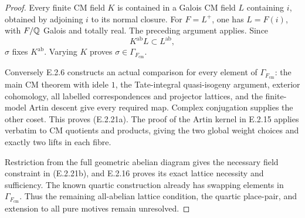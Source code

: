 \begin{proof}
Every finite CM field \(K\) is contained in
a Galois CM field \(L\) containing \(i\), obtained
by adjoining \(i\) to its normal closure.
For \(F=L^+\), one has \(L=F(i)\), with \(F/\mathbb Q\)
Galois and totally real. The preceding argument
applies. Since
\[
 K^{\mathrm{ab}}L\subset L^{\mathrm{ab}},
\]
\(\sigma\) fixes \(K^{\mathrm{ab}}\).
Varying \(K\) proves
\(\sigma\in\Gamma_{F_{\mathrm{cm}}}\).

Conversely E.2.6 constructs an actual comparison
for every element of \(\Gamma_{F_{\mathrm{cm}}}\):
the main CM theorem with idele \(1\), the
Tate-integral quasi-isogeny argument, exterior
cohomology, all labelled correspondences and
projector lattices, and the finite-model
Artin descent give every required map.
Complex conjugation supplies the other coset.
This proves (E.2.21a).
The proof of the Artin kernel in E.2.15 applies
verbatim to CM quotients and products, giving
the two global weight choices and exactly
two lifts in each fibre.

Restriction from the full geometric abelian
diagram gives the necessary field constraint
in (E.2.21b), and E.2.16 proves its exact
lattice necessity and sufficiency.
The known quartic construction already has
swapping elements in \(\Gamma_{F_{\mathrm{cm}}}\).
Thus the remaining all-abelian lattice condition,
the quartic place-pair, and extension to all
pure motives remain unresolved.
\end{proof}

